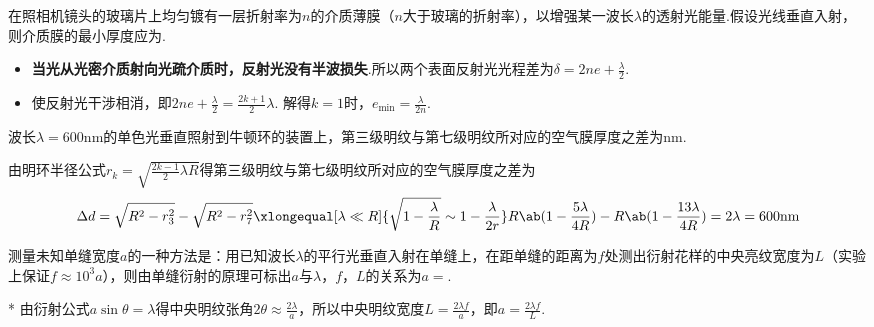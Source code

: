 \begin{problem}[增透膜][3]
    在照相机镜头的玻璃片上均匀镀有一层折射率为$n$的介质薄膜（$n$大于玻璃的折射率），以增强某一波长$\lambda$的透射光能量.假设光线垂直入射，则介质膜的最小厚度应为.
\end{problem}
\begin{solution}
    \begin{itemize}
        \item \textbf{当光从光密介质射向光疏介质时，反射光没有半波损失}.所以两个表面反射光光程差为$\delta=2ne+\frac\lambda2$.
        \item 使反射光干涉相消，即$2ne+\frac\lambda2=\frac{2k+1}{2}\lambda$. 解得$k=1$时，$e_{\min}=\frac{\lambda}{2n}$.
    \end{itemize}
\end{solution}

\begin{problem}[牛顿环][3]
    波长$\lambda=600\mathrm{nm}$的单色光垂直照射到牛顿环的装置上，第三级明纹与第七级明纹所对应的空气膜厚度之差为$\mathrm{nm}$.
\end{problem}
\begin{solution}
    由明环半径公式$r_k=\sqrt{\frac{2k-1}{2}\lambda R}$得第三级明纹与第七级明纹所对应的空气膜厚度之差为
    \[\Delta d=\sqrt{R^2-r_3^2}-\sqrt{R^2-r_7^2}\xlongequal[\lambda\ll R]{\sqrt{1-\frac{\lambda}{R}}\sim1-\frac{\lambda}{2r}}R\ab(1-\frac{5\lambda}{4R})-R\ab(1-\frac{13\lambda}{4R})=2\lambda=600\mathrm{nm}\]
\end{solution}

\begin{problem}[弗琅禾费衍射][3]
    测量未知单缝宽度$a$的一种方法是：用已知波长$\lambda$的平行光垂直入射在单缝上，在距单缝的距离为$f$处测出衍射花样的中央亮纹宽度为$L$（实验上保证$f\approx 10^3a$），则由单缝衍射的原理可标出$a$与$\lambda$，$f$，$L$的关系为$a=$.
\end{problem}
\begin{solution}*
    由衍射公式$a\sin{\theta}=\lambda$得中央明纹张角$2\theta\approx\frac{2\lambda}{a}$，所以中央明纹宽度$L=\frac{2\lambda f}{a}$，即$a=\frac{2\lambda f}{L}$.
\end{solution}

